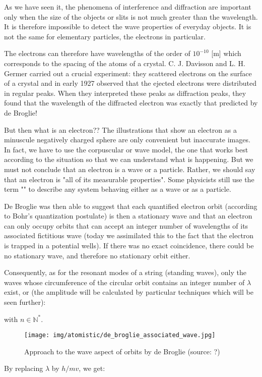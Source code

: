 	As we have seen it, the phenomena of interference and diffraction are important only when the size of the objects or slits is not much greater than the wavelength. It is therefore impossible to detect the wave properties of everyday objects. It is not the same for elementary particles, the electrons in particular.
	
	The electrons can therefore have wavelengths of the order of $10^{-10}$ [m] which corresponds to the spacing of the atoms of a crystal. C. J. Davisson and L. H. Germer carried out a crucial experiment: they scattered electrons on the surface of a crystal and in early 1927 observed that the ejected electrons were distributed in regular peaks. When they interpreted these peaks as diffraction peaks, they found that the wavelength of the diffracted electron was exactly that predicted by de Broglie!
	
	But then what is an electron?? The illustrations that show an electron as a minuscule negatively charged sphere are only convenient but inaccurate images. In fact, we have to use the corpuscular or wave model, the one that works best according to the situation so that we can understand what is happening. But we must not conclude that an electron is a wave or a particle. Rather, we should say that an electron is "all of its measurable properties". Some physicists still use the term "" to describe any system behaving either as a wave or as a particle.
	
	De Broglie was then able to suggest that each quantified electron orbit (according to Bohr's quantization postulate) is then a stationary wave and that an electron can only occupy orbits that can accept an integer number of wavelengths of its associated fictitious wave (today we assimilated this to the fact that the electron is trapped in a potential wells). If there was no exact coincidence, there could be no stationary wave, and therefore no stationary orbit either.
	
	Consequently, as for the resonant modes of a string (standing waves), only the waves whose circumference of the circular orbit contains an integer number of $\lambda$ exist, or (the amplitude will be calculated by particular techniques which will be seen further):
	
	with $n\in\mathbb{N}^{*}$.
	\begin{figure}[H]
		\centering
		\texttt{[image: img/atomistic/de\_broglie\_associated\_wave.jpg]}
		\caption[Approach to the wave aspect of orbits by de Broglie]{Approach to the wave aspect of orbits by de Broglie (source: ?)}
	\end{figure}
	By replacing $\lambda$ by $h/mv$, we get:
	
